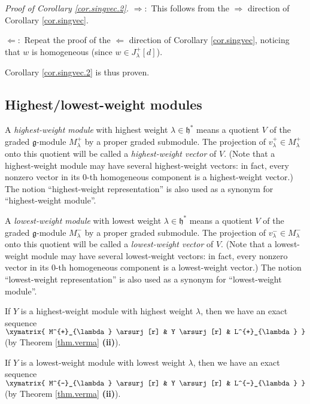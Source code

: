 \documentclass[etingof-lie.tex]{subfiles}
\begin{document}
\textit{Proof of Corollary \ref{cor.singvec.2}.} $\Longrightarrow:$ This
follows from the $\Longrightarrow$ direction of Corollary \ref{cor.singvec}.

$\Longleftarrow:$ Repeat the proof of the $\Longleftarrow$ direction of
Corollary \ref{cor.singvec}, noticing that $w$ is homogeneous (since $w\in
J_{\lambda}^{+}\left[  d\right]  $).

Corollary \ref{cor.singvec.2} is thus proven.

\subsection{Highest/lowest-weight modules}

\begin{definition}
A \textit{highest-weight module} with highest weight $\lambda\in
\mathfrak{h}^{\ast}$ means a quotient $V$ of the graded $\mathfrak{g}$-module
$M_{\lambda}^{+}$ by a proper graded submodule. The projection of $v_{\lambda
}^{+}\in M_{\lambda}^{+}$ onto this quotient will be called a
\textit{highest-weight vector} of $V$. (Note that a highest-weight module may
have several highest-weight vectors: in fact, every nonzero vector in its
$0$-th homogeneous component is a highest-weight vector.) The notion
``highest-weight representation'' is also used as a synonym for
``highest-weight module''.

A \textit{lowest-weight module} with lowest weight $\lambda\in\mathfrak{h}%
^{\ast}$ means a quotient $V$ of the graded $\mathfrak{g}$-module $M_{\lambda
}^{-}$ by a proper graded submodule. The projection of $v_{\lambda}^{-}\in
M_{\lambda}^{-}$ onto this quotient will be called a \textit{lowest-weight
vector} of $V$. (Note that a lowest-weight module may have several
lowest-weight vectors: in fact, every nonzero vector in its $0$-th homogeneous
component is a lowest-weight vector.) The notion ``lowest-weight
representation'' is also used as a synonym for ``lowest-weight module''.

If $Y$ is a highest-weight module with highest weight $\lambda$, then we have
an exact sequence $%
\xymatrix{
M^{+}_{\lambda} \arsurj[r] & Y \arsurj[r] & L^{+}_{\lambda}
}%
$ (by Theorem \ref{thm.verma} \textbf{(ii)}).

If $Y$ is a lowest-weight module with lowest weight $\lambda$, then we have an
exact sequence $%
\xymatrix{
M^{-}_{\lambda} \arsurj[r] & Y \arsurj[r] & L^{-}_{\lambda}
}%
$ (by Theorem \ref{thm.verma} \textbf{(ii)}).
\end{definition}
\end{document}
